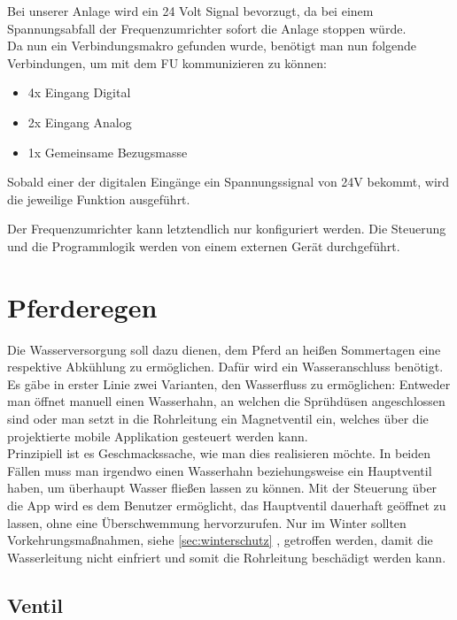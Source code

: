 Bei unserer Anlage wird ein 24 Volt Signal bevorzugt, da bei einem Spannungsabfall der Frequenzumrichter sofort die Anlage stoppen würde.\\

Da nun ein Verbindungsmakro gefunden wurde, benötigt man nun folgende Verbindungen, um mit dem \ac{FU} kommunizieren zu können:

\begin{itemize}
	\item{4x Eingang Digital}
	\item{2x Eingang Analog}
	\item{1x Gemeinsame Bezugsmasse}
\end{itemize}

Sobald einer der digitalen Eingänge ein Spannungssignal von 24V bekommt, wird die jeweilige Funktion ausgeführt. \newline{}

Der Frequenzumrichter kann letztendlich nur konfiguriert werden. Die Steuerung und die Programmlogik werden von einem externen Gerät durchgeführt. 

\newpage
\section{Pferderegen}
\label{sec:pferderegen}

Die Wasserversorgung soll dazu dienen, dem Pferd an heißen Sommertagen eine respektive Abkühlung zu ermöglichen. Dafür wird ein Wasseranschluss benötigt. Es gäbe in erster Linie zwei Varianten, den Wasserfluss zu ermöglichen: Entweder man öffnet manuell einen Wasserhahn, an welchen die Sprühdüsen angeschlossen sind oder man setzt in die Rohrleitung ein Magnetventil ein, welches über die projektierte mobile Applikation gesteuert werden kann. \\
Prinzipiell ist es Geschmackssache, wie man dies realisieren möchte. In beiden Fällen muss man irgendwo einen Wasserhahn beziehungsweise ein Hauptventil haben, um überhaupt Wasser fließen lassen zu können. 
Mit der Steuerung über die App wird es dem Benutzer ermöglicht, das Hauptventil dauerhaft geöffnet zu lassen, ohne eine Überschwemmung hervorzurufen. Nur im Winter sollten 
Vorkehrungsmaßnahmen, siehe \ref{sec:winterschutz} , getroffen werden, damit die Wasserleitung nicht einfriert und somit die Rohrleitung beschädigt werden kann. 

\subsection{Ventil}
\label{sec:ventil}

